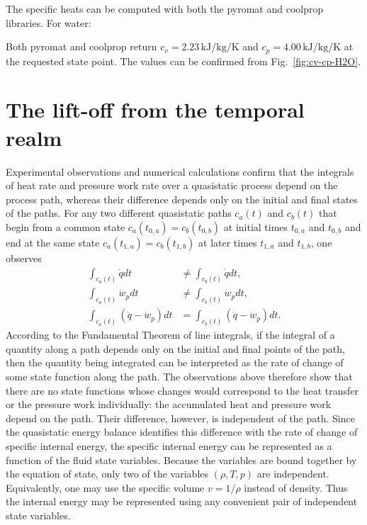 \begin{example}
    The specific heats can be computed with both the pyromat and coolprop libraries. For water:
    
    
    Both pyromat and coolprop return $c_v=2.23\,\text{kJ}/\text{kg}/\text{K}$ and $c_p=4.00\,\text{kJ}/\text{kg}/\text{K}$ at the requested state point. The values can be confirmed from Fig.~\ref{fig:cv-cp-H2O}.
\end{example}

\section{The lift-off from the temporal realm}
Experimental observations and numerical calculations confirm that the integrals of heat rate and pressure work rate over a quasistatic process depend on the process path, whereas their difference depends only on the initial and final states of the paths. For any two different quasistatic paths $c_a(t)$ and $c_b(t)$ that begin from a common state $c_a(t_{0,a})=c_b(t_{0,b})$ at initial times $t_{0,a}$ and $t_{0,b}$ and end at the same state $c_a(t_{1,a})=c_b(t_{1,b})$ at later times $t_{1,a}$ and $t_{1,b}$, one observes
\begin{align}
    \int_{c_a(t)}\dot{q}dt&\neq\int_{c_b(t)}\dot{q}dt,\\ \int_{c_a(t)}\dot{w}_pdt&\neq\int_{c_b(t)}\dot{w}_pdt,\\
    \int_{c_a(t)}(\dot{q}-\dot{w}_p)dt&=\int_{c_b(t)}(\dot{q}-\dot{w}_p)dt.
\end{align}
According to the Fundamental Theorem of line integrals, if the integral of a
quantity along a path depends only on the initial and final points of the path,
then the quantity being integrated can be interpreted as the rate of change of
some state function along the path. The observations above therefore show that
there are no state functions whose changes would correspond to the heat transfer
or the pressure work individually: the accumulated heat and pressure work depend
on the path. Their difference, however, is independent of the path. Since the
quasistatic energy balance identifies this difference with the rate of change of
specific internal energy, the specific internal energy can be represented as a
function of the fluid state variables. Because the variables are bound together by the equation of state, only two of the variables $(\rho,T,p)$ are independent. Equivalently, one may use the specific volume $v=1/\rho$ instead of density. Thus the internal energy may be represented using any convenient pair of independent state variables.

